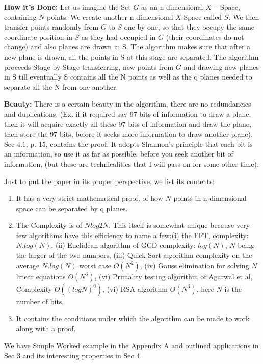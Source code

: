 \documentclass[english]{article}
\begin{document}
\medskip{}


\textbf{\large How it\textquoteright{}s Done:} Let us imagine the
Set $G$ as an n-dimensional $X-$Space, containing $N$ points. We
create another n-dimensional $X$-Space called $S$. We then transfer
points randomly from $G$ to $S$ one by one, so that they occupy
the same coordinate position in $S$ as they had occupied in $G$
(their coordinates do not change) and also planes are drawn in S.
The algorithm makes sure that after a new plane is drawn, all the
points in S at this stage are separated. The algorithm proceeds Stage
by Stage transferring, new points from $G$ and drawing new planes
in S till eventually S contains all the N points as well as the q
planes needed to separate all the N from one another. 

\medskip{}


\textbf{\large Beauty: }There is a certain beauty in the algorithm,
there are no redundancies and duplications. (Ex. if it required say
97 bits of information to draw a plane, then it will acquire exactly
all these 97 bits of information and draw the plane, then store the
97 bits, before it seeks more information to draw another plane),
Sec 4.1, p. 15, contains the proof. It adopts Shannon\textquoteright{}s
principle that each bit is an information, so use it as far as possible,
before you seek another bit of information, (but these are technicalities
that I will pass on for some other time).

\medskip{}


Just to put the paper in its proper perspective, we list its contents: 
\begin{enumerate}
\item It has a very strict mathematical proof, of how $N$ points in n-dimensional
space can be separated by q planes.
\item The Complexity is of $Nlog2N$. This itself is somewhat unique because
very few algorithms have this efficiency to name a few:(i) the FFT,
complexity: $N.log(N)$, (ii) Euclidean algorithm of GCD complexity:
$log(N)$, $N$ being the larger of the two numbers, (iii) Quick Sort
algorithm complexity on the average $N.log(N)$ worst case $O(N^{2})$,
(iv) Gauss elimination for solving $N$ linear equations $O(N^{3})$,
(vi) Primality testing algorithm of Agarwal et al, Complexity $O((logN)^{6})$,
(vi) RSA algorithm $O(N^{3})$, here $N$ is the number of bits.
\item It contains the conditions under which the algorithm can be made to
work along with a proof. 
\end{enumerate}
We have Simple Worked example in the Appendix A and outlined applications
in Sec 3 and its interesting properties in Sec 4.
\end{document}
